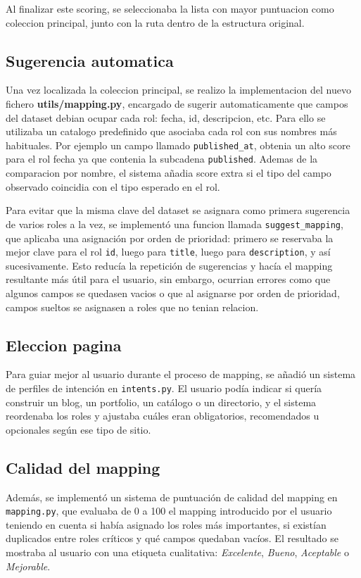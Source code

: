 Al finalizar este scoring, se seleccionaba la lista con mayor puntuacion como coleccion principal, junto con la ruta dentro de la estructura original.

\subsection{Sugerencia automatica}
\label{subsec:sugerencia-automatica}

Una vez localizada la coleccion principal, se realizo la implementacion del nuevo fichero \textbf{utils/mapping.py}, encargado de sugerir automaticamente que campos
del dataset debian ocupar cada rol: fecha, id, descripcion, etc. Para ello se utilizaba un catalogo predefinido que asociaba cada rol con sus nombres más habituales.
Por ejemplo un campo llamado \texttt{published\_at}, obtenia un alto score para el rol fecha ya que contenia la subcadena \texttt{published}.
Ademas de la comparacion por nombre, el sistema añadia score extra si el tipo del campo observado coincidia con el tipo esperado en el rol.

Para evitar que la misma clave del dataset se asignara como primera sugerencia de varios roles a la vez, se implementó una funcion llamada \texttt{suggest\_mapping}, que aplicaba una asignación por orden de prioridad: primero se reservaba la mejor clave para el rol \texttt{id}, luego para \texttt{title}, luego para \texttt{description}, y así sucesivamente. Esto reducía la repetición de sugerencias y hacía el mapping resultante más útil para el usuario, sin embargo, ocurrian errores como que algunos campos se quedasen vacios o que al asignarse por orden de prioridad, campos sueltos se asignasen a roles
que no tenian relacion.

\subsection*{Eleccion pagina}
\label{subsec:eleccion-pagina}

Para guiar mejor al usuario durante el proceso de mapping, se añadió un sistema de perfiles de intención en \texttt{intents.py}. El usuario podía indicar si quería construir un blog, un portfolio, un catálogo o un directorio, y el sistema reordenaba los roles y ajustaba cuáles eran obligatorios, recomendados u opcionales según ese tipo de sitio.


\subsection*{Calidad del mapping}
\label{subsec:calidad-mapping}
Además, se implementó un sistema de puntuación de calidad del mapping en \texttt{mapping.py}, que evaluaba de 0 a 100 el mapping introducido por el usuario teniendo en cuenta si había asignado los roles más importantes, si existían duplicados entre roles críticos y qué campos quedaban vacíos. El resultado se mostraba al usuario con una etiqueta cualitativa: \emph{Excelente}, \emph{Bueno}, \emph{Aceptable} o \emph{Mejorable}.


